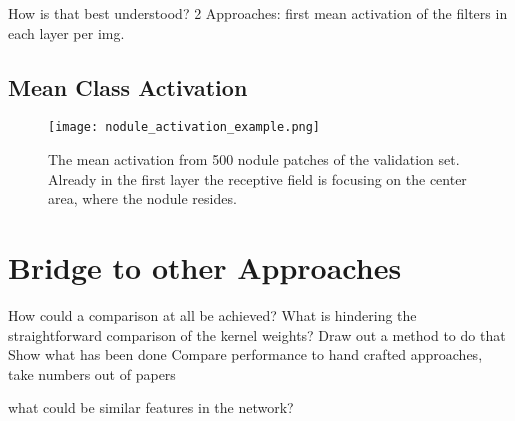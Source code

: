 \documentclass[main.tex]{subfiles}
\begin{document}
How is that best understood? 2 Approaches: first mean activation of the filters in each layer per img.

\subsection{Mean Class Activation}

\begin{figure}
\begin{center}
\texttt{[image: nodule\_activation\_example.png]}
\end{center}
\caption{The mean activation from 500 nodule patches of the validation set. Already in the first layer the receptive field is focusing on the center area, where the nodule resides.}
\label{fig:mean_activation}
\end{figure}


\section{Bridge to other Approaches}
How could a comparison at all be achieved? What is hindering the straightforward comparison of the kernel weights? Draw out a method to do that
Show what has been done
Compare performance to hand crafted approaches, 
take numbers out of papers

what could be similar features in the network?
\end{document}
